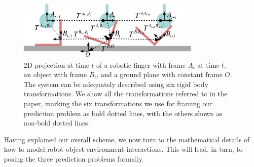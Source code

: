 \begin{figure}[t]
\centerline{\includegraphics[width=0.8\textwidth]{sequential-frames}
}
\caption[Setup1]{2D projection at time $t$ of a robotic finger with frame $A_{t}$ at time $t$,
an object with frame $B_{t}$, and a ground plane with constant frame
$O$. The system can be adequately described using six rigid body transformations. We show all the transformations referred to in the paper, marking the six transformations we use for framing our prediction problem as bold dotted lines, with the others shown as non-bold dotted lines. %
}
\label{fig:Learning.setup1}
\end{figure}
Having explained our overall scheme, we now turn to the mathematical details of how to model robot-object-environment interactions. This will lead, in turn, to posing the three prediction problems formally.